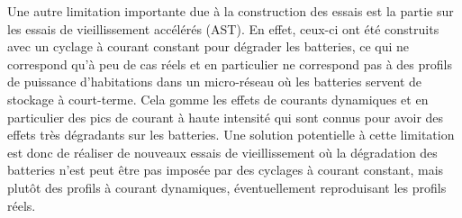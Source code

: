 Une autre limitation importante due à la construction des essais est la partie sur les essais de vieillissement accélérés (AST). En effet, ceux-ci ont été construits avec un cyclage à courant constant pour dégrader les batteries, ce qui ne correspond qu'à peu de cas réels et en particulier ne correspond pas à des profils de puissance d'habitations dans un micro-réseau où les batteries servent de stockage à court-terme. Cela gomme les effets de courants dynamiques et en particulier des pics de courant à haute intensité qui sont connus pour avoir des effets très dégradants sur les batteries. Une solution potentielle à cette limitation est donc de réaliser de nouveaux essais de vieillissement où la dégradation des batteries n'est peut être pas imposée par des cyclages à courant constant, mais plutôt des profils à courant dynamiques, éventuellement reproduisant les profils réels.

\newpage